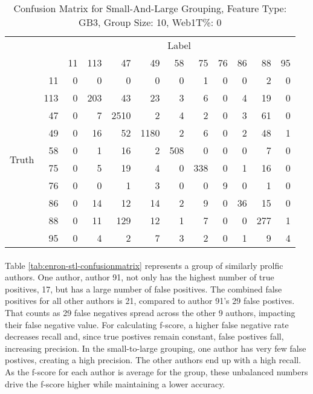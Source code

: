 	\begin{table}[htbp!]
	\begin{center}
			\begin{tabular}{ | c | r | r | r | r | r | r | r | r | r| r | r |}
			\cline{3-12}
			\multicolumn{2}{c}{} & \multicolumn{10}{|c|}{Label}\\ \cline{3-12}
			\multicolumn{2}{c|}{} & 11 & 113 & 47 & 49 & 58 & 75 & 76 & 86 & 88 & 95\\ \hline 
			\multirow{10}{*}{\begin{sideways}Truth\end{sideways}}& 11 & 0 & 0 & 0 & 0 & 0 & 1 & 0 & 0 & 2 & 0\\ \cline{2-12} 
			& 113 & 0 & 203 & 43 & 23 & 3 & 6 & 0 & 4 & 19 & 0\\ \cline{2-12} 
			& 47 & 0 & 7 & 2510 & 2 & 4 & 2 & 0 & 3 & 61 & 0\\ \cline{2-12}
			& 49 & 0 & 16 & 52 & 1180 & 2 & 6 & 0 & 2 & 48 & 1\\ \cline{2-12} 
			& 58 & 0 & 1 & 16 & 2 & 508 & 0 & 0 & 0 & 7 & 0\\ \cline{2-12} 
			& 75 & 0 & 5 & 19 & 4 & 0 & 338 & 0 & 1 & 16 & 0\\ \cline{2-12} 
			& 76 & 0 & 0 & 1 & 3 & 0 & 0 & 9 & 0 & 1 & 0\\ \cline{2-12} 
			& 86 & 0 & 14 & 12 & 14 & 2 & 9 & 0 & 36 & 15 & 0\\ \cline{2-12} 
			& 88 & 0 & 11 & 129 & 12 & 1 & 7 & 0 & 0 & 277 & 1\\ \cline{2-12} 
			& 95 & 0 & 4 & 2 & 7 & 3 & 2 & 0 & 1 & 9 & 4\\ \hline
	\end{tabular}
		\caption{Confusion Matrix for Small-And-Large Grouping, Feature Type: GB3, Group Size: 10, Web1T\%: 0}
		\label{tab:enron-sal-confusionmatrix}
		\end{center}	
	\end{table}
	
	\paragraph*{} Table \ref{tab:enron-stl-confusionmatrix} represents a group of similarly prolfic authors.  One author, author 91, not only has the highest number of true positives, 17, but has a large number of false positives.  The combined false positives for all other authors is 21, compared to author 91's 29 false postives.  That counts as 29 false negatives spread across the other 9 authors, impacting their false negative value.  For calculating f-score, a higher false negative rate decreases recall and, since true postives remain constant, false postives fall, increasing precision.  In the small-to-large grouping, one author has very few false postives, creating a high precision.  The other authors end up with a high recall.  As the f-score for each author is average for the group, these unbalanced numbers drive the f-score higher while maintaining a lower accuracy.
